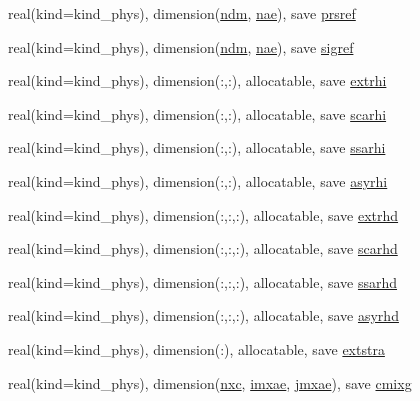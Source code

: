 \begin{DoxyCompactItemize}
\item 
real(kind=kind\+\_\+phys), dimension(\hyperlink{group__module__radiation__aerosols_gae77b22f76f193cef19b6e6c3ee8e0773}{ndm}, \hyperlink{group__module__radiation__aerosols_ga45121ca4dcb3194e8afb4090fa810657}{nae}), save \hyperlink{group__module__radiation__aerosols_ga274fad1b6e00e66375882e32494d61c0}{prsref}
\item 
real(kind=kind\+\_\+phys), dimension(\hyperlink{group__module__radiation__aerosols_gae77b22f76f193cef19b6e6c3ee8e0773}{ndm}, \hyperlink{group__module__radiation__aerosols_ga45121ca4dcb3194e8afb4090fa810657}{nae}), save \hyperlink{group__module__radiation__aerosols_ga227ac7558dc0f33c34c34544771617ec}{sigref}
\item 
real(kind=kind\+\_\+phys), dimension(\+:,\+:), allocatable, save \hyperlink{group__module__radiation__aerosols_ga40447f925f01790155c4d98ff8b0c04d}{extrhi}
\item 
real(kind=kind\+\_\+phys), dimension(\+:,\+:), allocatable, save \hyperlink{group__module__radiation__aerosols_ga439929b1de549fadecc8537bae13e9de}{scarhi}
\item 
real(kind=kind\+\_\+phys), dimension(\+:,\+:), allocatable, save \hyperlink{group__module__radiation__aerosols_gae4e1ead8bb34371c2d9f1b428846c10c}{ssarhi}
\item 
real(kind=kind\+\_\+phys), dimension(\+:,\+:), allocatable, save \hyperlink{group__module__radiation__aerosols_gaac2d735c117dd7d1e72264e611764f79}{asyrhi}
\item 
real(kind=kind\+\_\+phys), dimension(\+:,\+:,\+:), allocatable, save \hyperlink{group__module__radiation__aerosols_ga1c69f7b8ff0c98252e94def83dabfed4}{extrhd}
\item 
real(kind=kind\+\_\+phys), dimension(\+:,\+:,\+:), allocatable, save \hyperlink{group__module__radiation__aerosols_ga859ba893a7b0b727ce02f3f29906a0a6}{scarhd}
\item 
real(kind=kind\+\_\+phys), dimension(\+:,\+:,\+:), allocatable, save \hyperlink{group__module__radiation__aerosols_gac0714d386ee3dc2ca7f6692905566274}{ssarhd}
\item 
real(kind=kind\+\_\+phys), dimension(\+:,\+:,\+:), allocatable, save \hyperlink{group__module__radiation__aerosols_ga090d37e62ba333db64e28bf89e89a08d}{asyrhd}
\item 
real(kind=kind\+\_\+phys), dimension(\+:), allocatable, save \hyperlink{group__module__radiation__aerosols_gac0c59f22f472671cd86221cc1ed46c60}{extstra}
\item 
real(kind=kind\+\_\+phys), dimension(\hyperlink{group__module__radiation__aerosols_ga1fffbb55ad2986a216b721a6c103c4cf}{nxc}, \hyperlink{group__module__radiation__aerosols_ga52cda855a397136f75768d205292ddbb}{imxae}, \hyperlink{group__module__radiation__aerosols_gafdfdd058364062349b02cec9c712ea80}{jmxae}), save \hyperlink{group__module__radiation__aerosols_ga358c83599fb321a59c958e54d9f284d9}{cmixg}

\end{DoxyCompactItemize}
